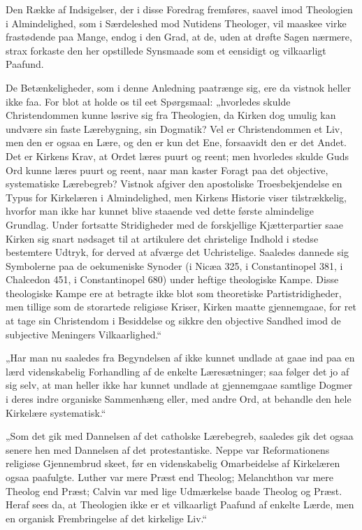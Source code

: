 \documentclass[12pt,a4paper]{book}
\newcommand{\opage}[1]{\marginnote{\footnotesize\textit{[#1]}}}
\begin{document}
\opage{112} Den Række af Indsigelser, der i disse Foredrag fremføres, saavel imod
Theologien i Almindelighed, som i Særdeleshed mod Nutidens Theologer, vil
maaskee virke frastødende paa Mange, endog i den Grad, at de, uden at drøfte
Sagen nærmere, strax forkaste den her opstillede Synsmaade som et eensidigt og
vilkaarligt Paafund.

De Betænkeligheder, som i denne Anledning paatrænge sig, ere da vistnok
heller ikke faa. For blot at holde os til eet Spørgsmaal: „hvorledes skulde
Christendommen kunne løsrive sig fra Theologien, da Kirken dog umulig kan
undvære sin faste Lærebygning, sin Dogmatik? Vel er Christendommen et Liv, men
den er ogsaa en Lære, og den er kun det Ene, forsaavidt den er det Andet. Det
er Kirkens Krav, at Ordet læres puurt og reent; men hvorledes skulde Guds Ord
kunne læres puurt og reent, naar man kaster Foragt paa det objective,
systematiske Lærebegreb? Vistnok afgiver den apostoliske Troesbekjendelse en
\opage{113} Typus for Kirkelæren i Almindelighed, men Kirkens Historie viser tilstrækkelig,
hvorfor man ikke har kunnet blive staaende ved dette første almindelige
Grundlag. Under fortsatte Stridigheder med de forskjellige Kjætterpartier saae
Kirken sig snart nødsaget til at artikulere det christelige Indhold i stedse
bestemtere Udtryk, for derved at afværge det Uchristelige. Saaledes dannede sig
Symbolerne paa de oekumeniske Synoder (i Nicæa 325, i Constantinopel 381, i
Chalcedon 451, i Constantinopel 680) under heftige theologiske Kampe. Disse
theologiske Kampe ere at betragte ikke blot som theoretiske Partistridigheder,
men tillige som de storartede religiøse Kriser, Kirken maatte gjennemgaae, for
ret at tage sin Christendom i Besiddelse og sikkre den objective Sandhed imod
de subjective Meningers Vilkaarlighed.“

„Har man nu saaledes fra Begyndelsen af ikke kunnet undlade at gaae ind paa
en lærd videnskabelig Forhandling af de enkelte Læresætninger; saa følger det
jo af sig selv, at man heller ikke har kunnet undlade at gjennemgaae samtlige
Dogmer i deres indre organiske Sammenhæng eller, med andre Ord, at behandle den
hele Kirkelære systematisk.“

„Som det gik med Dannelsen af det catholske Lærebegreb, saaledes gik det
ogsaa senere hen med Dannelsen af det protestantiske. Neppe var Reformationens
religiøse Gjennembrud skeet, før en videnskabelig Omarbeidelse af Kirkelæren
ogsaa paafulgte. Luther var mere Præst end Theolog; Melanchthon var mere Theolog
end Præst; Calvin var med lige Udmærkelse baade Theolog og Præst. Heraf sees
da, at Theologien ikke er et vilkaarligt Paafund af enkelte Lærde, men en
organisk Frembringelse af det kirkelige Liv.“
\end{document}
